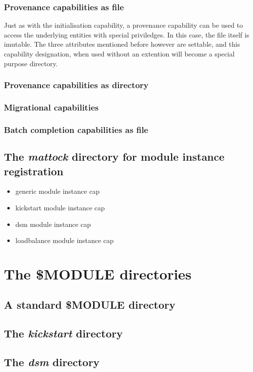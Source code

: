\begin{itemize}
\begin{itemize}
\begin{itemize}
\begin{itemize}
\subsubsection{Provenance capabilities as file}
Just as with the initialisation capability, a provenance capability can be used to access the underlying entities with special priviledges. In this case, the file itself is imutable. The three attributes mentioned before however are settable, and this capability designation, when used without an extention will become a special purpose directory. 
\subsubsection{Provenance capabilities as directory}
\subsubsection{Migrational capabilities}
\subsubsection{Batch completion capabilities as file}
\subsection{The \emph{mattock} directory for module instance registration}
\begin{itemize}
\item generic module instance cap
\item kickstart module instance cap
\item dsm module instance cap
\item loadbalance module instance cap
\end{itemize}

\section{The \$MODULE directories}
\subsection{A standard \$MODULE directory}
\subsection{The \emph{kickstart} directory}
\subsection{The \emph{dsm} directory}

\end{itemize}
\end{itemize}
\end{itemize}
\end{itemize}
